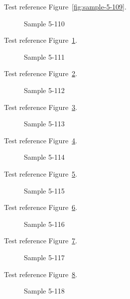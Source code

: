 Test reference Figure~\ref{fig:sample-5-109}.

\begin{figure}[tbhp]
\caption{Sample 5-110}
\label{fig:sample-5-110}
\end{figure}

Test reference Figure~\ref{fig:sample-5-110}.

\begin{figure}[tbhp]
\caption{Sample 5-111}
\label{fig:sample-5-111}
\end{figure}

Test reference Figure~\ref{fig:sample-5-111}.

\begin{figure}[tbhp]
\caption{Sample 5-112}
\label{fig:sample-5-112}
\end{figure}

Test reference Figure~\ref{fig:sample-5-112}.

\begin{figure}[tbhp]
\caption{Sample 5-113}
\label{fig:sample-5-113}
\end{figure}

Test reference Figure~\ref{fig:sample-5-113}.

\begin{figure}[tbhp]
\caption{Sample 5-114}
\label{fig:sample-5-114}
\end{figure}

Test reference Figure~\ref{fig:sample-5-114}.

\begin{figure}[tbhp]
\caption{Sample 5-115}
\label{fig:sample-5-115}
\end{figure}

Test reference Figure~\ref{fig:sample-5-115}.

\begin{figure}[tbhp]
\caption{Sample 5-116}
\label{fig:sample-5-116}
\end{figure}

Test reference Figure~\ref{fig:sample-5-116}.

\begin{figure}[tbhp]
\caption{Sample 5-117}
\label{fig:sample-5-117}
\end{figure}

Test reference Figure~\ref{fig:sample-5-117}.

\begin{figure}[tbhp]
\caption{Sample 5-118}
\label{fig:sample-5-118}
\end{figure}

